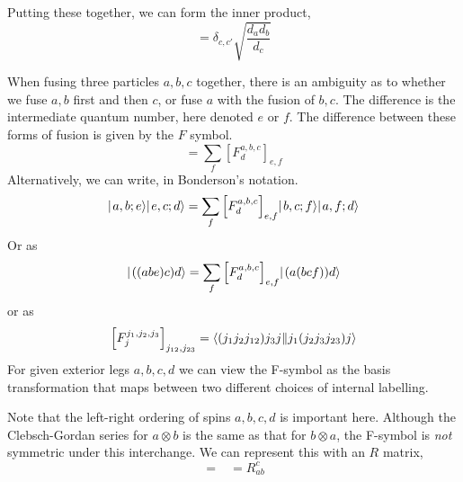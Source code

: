 \documentclass[12pt]{article}
\newcommand{\fsymbol}[6]{\mbox{$\left[ F^{#1,#2,#3}_{#4} \right]_{#5,#6}$}}
\begin{document}
Putting these together, we can form the inner product,
\begin{equation}
\begin{gathered}

\end{gathered}
= \delta_{c,c'} \sqrt{\frac{d_a d_b}{d_c}}
\begin{gathered}

\end{gathered}
\end{equation}

When fusing three particles $a,b,c$ together, there is an ambiguity as to whether
we fuse $a,b$ first and then $c$, or fuse $a$ with the fusion of $b,c$. The difference
is the intermediate quantum number, here denoted $e$ or $f$. The difference between
these forms of fusion is given by the $F$ symbol.
\begin{equation}
\begin{gathered}

\end{gathered}
= \sum_f \fsymbol{a}{b}{c}{d}{e}{f}
\begin{gathered}

\end{gathered}
\end{equation}
Alternatively, we can write, in Bonderson's notation.
\begin{equation}
\ket{a,b;e} \ket{e,c;d} = \sum_f  \fsymbol{a}{b}{c}{d}{e}{f} \ket{b,c;f} \ket{a,f;d}
\end{equation}
Or as
\begin{equation}
\ket{((abe)c)d} = \sum_f \fsymbol{a}{b}{c}{d}{e}{f} \ket{(a(bcf))d}
\end{equation}
or as
\begin{equation}
\fsymbol{j_1}{j_2}{j_3}{j}{j_{12}}{j_{23}} 
= \rbraket{(j_1 j_2 j_{12}) j_3 j}{j_1 (j_2 j_3 j_{23}) j}
\end{equation}
For given exterior legs $a,b,c,d$ we can view the F-symbol as the basis transformation
that maps between two different choices of internal labelling.

Note that the left-right ordering of spins $a,b,c,d$ is important here. Although the
Clebsch-Gordan series for $a \otimes b$ is the same as that for $b \otimes a$, the
F-symbol is \emph{not} symmetric under this interchange. We can represent this with an
$R$ matrix,
\begin{equation}
\begin{gathered}

\end{gathered}
=
\begin{gathered}

\end{gathered}
= R^c_{ab}
\begin{gathered}

\end{gathered}
\end{equation}
\end{document}
